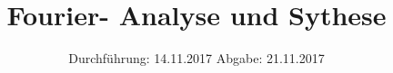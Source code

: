 

\subject{Versuch 351}
\title{Fourier- Analyse und Sythese}
\date{%
  Durchführung: 14.11.2017
  \hspace{3em}
  Abgabe: 21.11.2017
}



\maketitle
\thispagestyle{empty}
\tableofcontents
\newpage






\printbibliography{}


